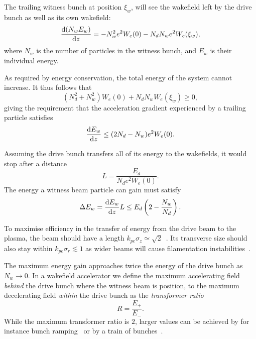 The trailing witness bunch at position $\xi_{w}$, will see the wakefield left by the drive bunch as well as its own wakefield:
\begin{equation}
    \frac{\mathrm{d} (N_{w}E_{w})}{\mathrm{d} z}
        = - N_{w}^{2}e^{2}W_{e}(0) - N_{d}N_{w}e^{2}W_{e}(\xi_{w}), \label{EQ:TRat:Witness}
\end{equation}
where $N_{w}$ is the number of particles in the witness bunch, and $E_{w}$ is their individual energy.

As required by energy conservation, the total energy of the system cannot increase. It thus follows that
\begin{equation}
    (N_{d}^{2} + N_{w}^{2})W_{e}(0) + N_{d}N_{w}W_{e}(\xi_{w}) \geq 0, \label{EQ:TRat:EConv}
\end{equation}
giving the requirement that the acceleration gradient experienced by a trailing particle satisfies
\begin{equation}
    \frac{\mathrm{d} E_{w}}{\mathrm{d} z} \leq (2N_{d} - N_{w})e^{2}W_{e}(0). \label{EQ:TRat:Grad}
\end{equation}

Assuming the drive bunch transfers all of its energy to the wakefields, it would stop after a distance
\begin{equation}
    L = \frac{E_{d}}{N_{d}e^{2}W_{e}(0)}. \label{EQ:Trat:LStop}
\end{equation}
The energy a witness beam particle can gain must satisfy
\begin{equation}
    \Delta E_{w} = \frac{\mathrm{d} E_{w}}{\mathrm{d} z}L
                 \leq E_{d}\left(2-\frac{N_{w}}{N_{d}}\right). \label{EQ:TRat:DeltaE}
\end{equation}

To maximise efficiency in the transfer of energy from the drive beam to the plasma, the beam should have a length $k_{pe}\sigma_{z} \simeq \sqrt{2}$~\cite{lu:2005,lee:2000}. Its transverse size should also stay within $k_{pe}\sigma_{r} \lesssim 1$ as wider beams will cause filamentation instabilities~\cite{allen:2012,sentoku:2003}.

The maximum energy gain approaches twice the energy of the drive bunch as $N_{w} \to 0$. In a wakefield accelerator we define the maximum accelerating field \textit{behind} the drive bunch where the witness beam is position, to the maximum decelerating field \textit{within} the drive bunch as the \textit{transformer ratio}~\cite{muggli:2017}
\begin{equation}
    R = \frac{E_{+}}{E_{-}}. \label{EQ:TRat}
\end{equation}
While the maximum transformer ratio is $2$, larger values can be achieved by for instance bunch ramping~\cite{bane:1985} or by a train of bunches~\cite{jing:2006}.

